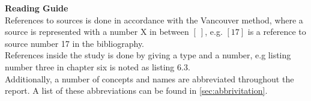 \noindent \textbf{Reading Guide}\\
References to sources is done in accordance with the Vancouver method, where a source is represented with a number X in between $[\ ]$, e.g. $[17]$ is a reference to source number 17 in the bibliography. 
\\\indent
References inside the study is done by giving a type and a number, e.g listing number three in chapter six is noted as listing 6.3.
\\\indent
Additionally, a number of concepts and names are abbreviated throughout the report.
A list of these abbreviations can be found in \cref{sec:abbrivitation}.